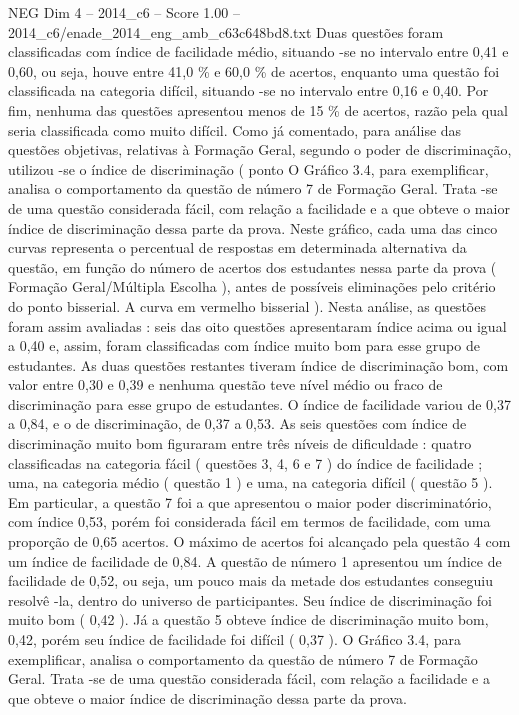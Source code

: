 \begin{textsample}{NEG Dim 4 – 2014\_c6 – Score 1.00 – 2014\_c6/enade\_2014\_eng\_amb\_c63c648bd8.txt}
Duas questões foram classificadas com índice de facilidade médio, situando -se no intervalo entre 0,41 e 0,60, ou seja, houve entre 41,0 \% e 60,0 \% de acertos, enquanto uma questão foi classificada na categoria difícil, situando -se no intervalo entre 0,16 e 0,40.
Por fim, nenhuma das questões apresentou menos de 15 \% de acertos, razão pela qual seria classificada como muito difícil.
Como já comentado, para análise das questões objetivas, relativas à Formação Geral, segundo o poder de discriminação, utilizou -se o índice de discriminação ( ponto O Gráfico 3.4, para exemplificar, analisa o comportamento da questão de número 7 de Formação Geral.
Trata -se de uma questão considerada fácil, com relação a facilidade e a que obteve o maior índice de discriminação dessa parte da prova.
Neste gráfico, cada uma das cinco curvas representa o percentual de respostas em determinada alternativa da questão, em função do número de acertos dos estudantes nessa parte da prova ( Formação Geral/Múltipla Escolha ), antes de possíveis eliminações pelo critério do ponto bisserial.
A curva em vermelho bisserial ).
Nesta análise, as questões foram assim avaliadas : seis das oito questões apresentaram índice acima ou igual a 0,40 e, assim, foram classificadas com índice muito bom para esse grupo de estudantes.
As duas questões restantes tiveram índice de discriminação bom, com valor entre 0,30 e 0,39 e nenhuma questão teve nível médio ou fraco de discriminação para esse grupo de estudantes.
O índice de facilidade variou de 0,37 a 0,84, e o de discriminação, de 0,37 a 0,53.
As seis questões com índice de discriminação muito bom figuraram entre três níveis de dificuldade : quatro classificadas na categoria fácil ( questões 3, 4, 6 e 7 ) do índice de facilidade ; uma, na categoria médio ( questão 1 ) e uma, na categoria difícil ( questão 5 ).
Em particular, a questão 7 foi a que apresentou o maior poder discriminatório, com índice 0,53, porém foi considerada fácil em termos de facilidade, com uma proporção de 0,65 acertos.
O máximo de acertos foi alcançado pela questão 4 com um índice de facilidade de 0,84.
A questão de número 1 apresentou um índice de facilidade de 0,52, ou seja, um pouco mais da metade dos estudantes conseguiu resolvê -la, dentro do universo de participantes.
Seu índice de discriminação foi muito bom ( 0,42 ).
Já a questão 5 obteve índice de discriminação muito bom, 0,42, porém seu índice de facilidade foi difícil ( 0,37 ).
O Gráfico 3.4, para exemplificar, analisa o comportamento da questão de número 7 de Formação Geral.
Trata -se de uma questão considerada fácil, com relação a facilidade e a que obteve o maior índice de discriminação dessa parte da prova.

\end{textsample}
